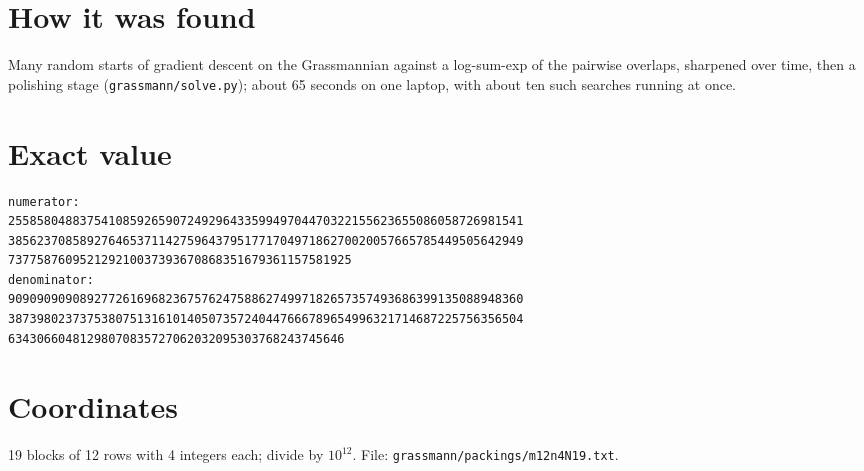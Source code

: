 \documentclass[11pt,a4paper]{article}
\begin{document}
\section{How it was found}
Many random starts of gradient descent on the Grassmannian against a log-sum-exp of the pairwise overlaps, sharpened over time, then a polishing stage (\texttt{grassmann/solve.py}); about 65 seconds on one laptop, with about ten such searches running at once.


\appendix
\section{Exact value}
{\small
\begin{verbatim}
numerator:
255858048837541085926590724929643359949704470322155623655086058726981541
385623708589276465371142759643795177170497186270020057665785449505642949
737758760952129210037393670868351679361157581925
denominator:
909090909089277261696823675762475886274997182657357493686399135088948360
387398023737538075131610140507357240447666789654996321714687225756356504
63430660481298070835727062032095303768243745646
\end{verbatim}}

\section{Coordinates}
19 blocks of 12 rows with 4 integers each; divide by $10^{12}$. File: \texttt{grassmann/packings/m12n4N19.txt}.
{\tiny
\begin{multicols}{3}
\end{multicols}}
\end{document}
